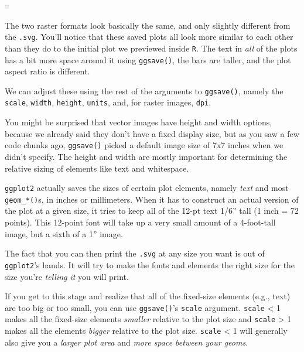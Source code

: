 \documentclass[
]{book}
\begin{document}
\begin{center}\includegraphics[width=7px]{img/penalty-lift-jpeg} \end{center}

The two raster formats look basically the same, and only slightly different from the \texttt{.svg}. You'll notice that these saved plots all look more similar to each other than they do to the initial plot we previewed inside \texttt{R}. The text in \emph{all} of the plots has a bit more space around it using \texttt{ggsave()}, the bars are taller, and the plot aspect ratio is different.

We can adjust these using the rest of the arguments to \texttt{ggsave()}, namely the \texttt{scale}, \texttt{width}, \texttt{height}, \texttt{units}, and, for raster images, \texttt{dpi}.

You might be surprised that vector images have height and width options, because we already said they don't have a fixed display size, but as you saw a few code chunks ago, \texttt{ggsave()} picked a default image size of 7x7 inches when we didn't specify. The height and width are mostly important for determining the relative sizing of elements like text and whitespace.

\texttt{ggplot2} actually saves the sizes of certain plot elements, namely \emph{text} and most \texttt{geom\_*()}s, in inches or millimeters. When it has to construct an actual version of the plot at a given size, it tries to keep all of the 12-pt text 1/6'' tall (1 inch = 72 points). This 12-point font will take up a very small amount of a 4-foot-tall image, but a sixth of a 1'' image.

The fact that you can then print the \texttt{.svg} at any size you want is out of \texttt{ggplot2}'s hands. It will try to make the fonts and elements the right size for the size you're \emph{telling it} you will print.

If you get to this stage and realize that all of the fixed-size elements (e.g., text) are too big or too small, you can use \texttt{ggsave()}'s \texttt{scale} argument. \texttt{scale} \textless{} 1 makes all the fixed-size elements \emph{smaller} relative to the plot size and \texttt{scale} \textgreater{} 1 makes all the elements \emph{bigger} relative to the plot size. \texttt{scale} \textless{} 1 will generally also give you a \emph{larger plot area} and \emph{more space between your geoms}.
\end{document}
